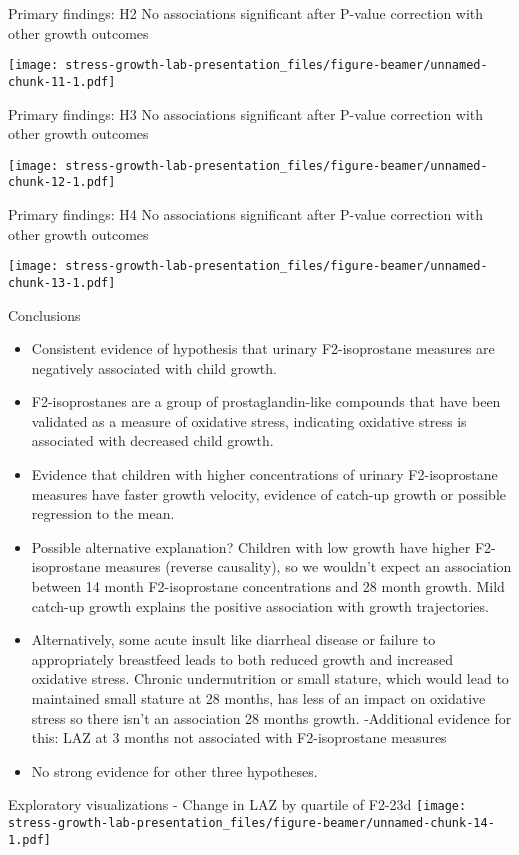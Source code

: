 \documentclass[
  ignorenonframetext,
]{beamer}
\providecommand{\tightlist}{%
  \setlength{\itemsep}{0pt}\setlength{\parskip}{0pt}}
\begin{document}
\begin{frame}{Primary findings: H2}
\protect\hypertarget{primary-findings-h2}{}
No associations significant after P-value correction with other growth
outcomes

\texttt{[image: stress-growth-lab-presentation\_files/figure-beamer/unnamed-chunk-11-1.pdf]}
\end{frame}

\begin{frame}{Primary findings: H3}
\protect\hypertarget{primary-findings-h3}{}
No associations significant after P-value correction with other growth
outcomes

\texttt{[image: stress-growth-lab-presentation\_files/figure-beamer/unnamed-chunk-12-1.pdf]}
\end{frame}

\begin{frame}{Primary findings: H4}
\protect\hypertarget{primary-findings-h4}{}
No associations significant after P-value correction with other growth
outcomes

\texttt{[image: stress-growth-lab-presentation\_files/figure-beamer/unnamed-chunk-13-1.pdf]}
\end{frame}

\begin{frame}{Conclusions}
\protect\hypertarget{conclusions}{}
\begin{itemize}[<+->]
\tightlist
\item
  Consistent evidence of hypothesis that urinary F2-isoprostane measures
  are negatively associated with child growth.
\item
  F2-isoprostanes are a group of prostaglandin-like compounds that have
  been validated as a measure of oxidative stress, indicating oxidative
  stress is associated with decreased child growth.
\item
  Evidence that children with higher concentrations of urinary
  F2-isoprostane measures have faster growth velocity, evidence of
  catch-up growth or possible regression to the mean.
\item
  Possible alternative explanation? Children with low growth have higher
  F2-isoprostane measures (reverse causality), so we wouldn't expect an
  association between 14 month F2-isoprostane concentrations and 28
  month growth. Mild catch-up growth explains the positive association
  with growth trajectories.
\item
  Alternatively, some acute insult like diarrheal disease or failure to
  appropriately breastfeed leads to both reduced growth and increased
  oxidative stress. Chronic undernutrition or small stature, which would
  lead to maintained small stature at 28 months, has less of an impact
  on oxidative stress so there isn't an association 28 months growth.
  -Additional evidence for this: LAZ at 3 months not associated with
  F2-isoprostane measures
\item
  No strong evidence for other three hypotheses.
\end{itemize}
\end{frame}

\begin{frame}{Exploratory visualizations - Change in LAZ by quartile of
F2-23d}
\protect\hypertarget{exploratory-visualizations---change-in-laz-by-quartile-of-f2-23d}{}
\texttt{[image: stress-growth-lab-presentation\_files/figure-beamer/unnamed-chunk-14-1.pdf]}
\end{frame}
\end{document}
